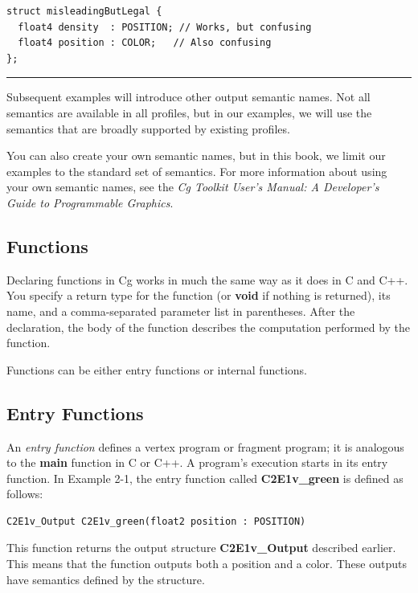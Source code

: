 \documentclass{book}
\begin{document}
\FloatBarrier
\begin{lstlisting}
struct misleadingButLegal {
  float4 density  : POSITION; // Works, but confusing
  float4 position : COLOR;   // Also confusing
};
\end{lstlisting}
\FloatBarrier
\hrule

Subsequent examples will introduce other output semantic names. Not all semantics are available in all profiles, but in our examples, we will use the semantics that are broadly supported by existing profiles.

You can also create your own semantic names, but in this book, we limit our examples to the standard set of semantics. For more information about using your own semantic names, see the \textit{Cg Toolkit User's Manual: A Developer's Guide to Programmable Graphics}.

\subsection{Functions}

Declaring functions in Cg works in much the same way as it does in C and C++. You specify a return type for the function (or \textbf{void} if nothing is returned), its name, and a comma-separated parameter list in parentheses. After the declaration, the body of the function describes the computation performed by the function.

Functions can be either entry functions or internal functions.

\subsection*{Entry Functions}

An \textit{entry function} defines a vertex program or fragment program; it is analogous to the \textbf{main} function in C or C++. A program's execution starts in its entry function. In Example 2-1, the entry function called \textbf{C2E1v\_green} is defined as follows:

\FloatBarrier
\begin{lstlisting}
C2E1v_Output C2E1v_green(float2 position : POSITION)
\end{lstlisting}
\FloatBarrier

This function returns the output structure \textbf{C2E1v\_Output} described earlier. This means that the function outputs both a position and a color. These outputs have semantics defined by the structure.
\end{document}
